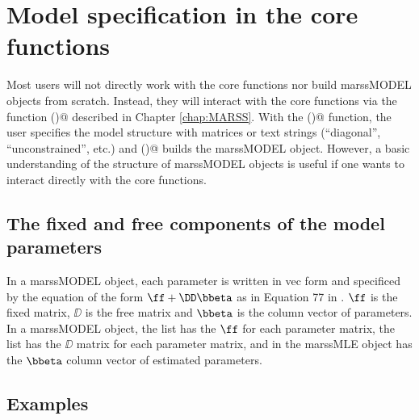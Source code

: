 \chapter{Model specification in the core functions}
\label{chap:modelspec}
Most users will not directly work with the core functions nor build marssMODEL objects from scratch.  Instead, they will interact with the core functions via the function \verb@MARSS()@ described in Chapter \ref{chap:MARSS}.  With the \verb@MARSS()@  function, the user specifies the model structure with matrices or text strings (``diagonal'', ``unconstrained'', etc.) and \verb@MARSS()@ builds the marssMODEL object.   However, a basic understanding of the structure of marssMODEL objects is useful if one wants to  interact directly with the core functions.

\section{The fixed and free components of the model parameters}
In a marssMODEL object, each parameter is written in vec form and specificed by the equation of the form $\ff + \DD\bbeta$ as in Equation 77 in \citet{Holmes2010}. $\ff$ is the fixed matrix, $\DD$ is the free matrix and $\bbeta$ is the column vector of parameters.  In a marssMODEL object, the \verb@fixed@ list has the $\ff$ for each parameter matrix, the \verb@free@ list has the $\DD$ matrix for each parameter matrix, and \verb@par@ in the marssMLE object has the $\bbeta$ column vector of estimated parameters.

\section{Examples}

